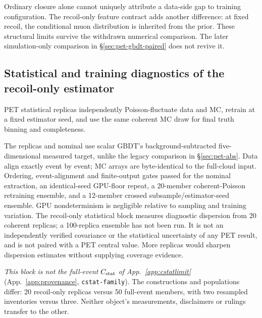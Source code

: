 Ordinary closure alone cannot uniquely attribute a data-side gap to training configuration. The recoil-only feature contract adds another difference: at fixed recoil, the conditional muon distribution is inherited from the prior. These structural limits survive the withdrawn numerical comparison. The later simulation-only comparison in \S\ref{sec:pet-gbdt-paired} does not revive it.

\subsection{Statistical and training diagnostics of the recoil-only estimator}
\label{sec:pet-syst}
PET statistical replicas independently Poisson-fluctuate data and MC, retrain at a fixed estimator seed, and use the same coherent MC draw for final truth binning and completeness.

The replicas and nominal use scalar GBDT's background-subtracted five-dimensional measured target, unlike the legacy comparison in \S\ref{sec:pet-abs}. Data align exactly event by event; MC arrays are byte-identical to the full-cloud input. Ordering, event-alignment and finite-output gates passed for the nominal extraction, an identical-seed GPU-floor repeat, a 20-member coherent-Poisson retraining ensemble, and a 12-member crossed subsample/estimator-seed ensemble. GPU nondeterminism is negligible relative to sampling and training variation. The recoil-only statistical block measures diagnostic dispersion from 20 coherent replicas; a 100-replica ensemble has not been run. It is not an independently verified covariance or the statistical uncertainty of any PET result, and is not paired with a PET central value. More replicas would sharpen dispersion estimates without supplying coverage evidence.

\emph{This block is not the full-event} $C_{\rm stat}$ \emph{of App.~\ref{app:cstatlimit}} (App.~\ref{app:provenance}, \texttt{cstat-family}). The constructions and populations differ: 20 recoil-only replicas versus 50 full-event members, with two resampled inventories versus three. Neither object's measurements, disclaimers or rulings transfer to the other.

